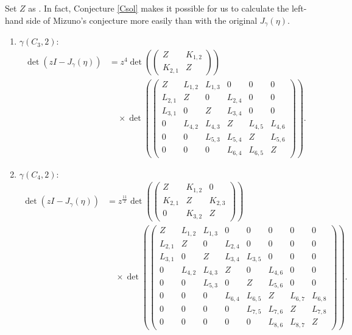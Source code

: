\documentclass[10pt,a4paper]{amsart}
\numberwithin{equation}{section}
\begin{document}
	\begin{Example}
Set $Z$ as .
In fact, Conjecture \ref{Csol} makes it possible for us to calculate the left-hand side of Mizuno's conjecture more easily than with the original $J_\gamma(\eta)$.
		\begin{enumerate}\itemsep=0pt
			\item $\gamma(C_3,2)$:
				\begin{align*}
				\det (zI-J_\gamma(\eta))&{}=z^4\det \left(\begin{pmatrix}
					Z&K_{1,2}\\
					K_{2,1}&Z
				\end{pmatrix}\right)\\
				&\quad{}\times\det \left(\begin{pmatrix}
					Z&L_{1,2}&L_{1,3}&0&0&0\\%
					L_{2,1}&Z&0&L_{2,4}&0&0\\%
					L_{3,1}&0&Z&L_{3,4}&0&0\\%
					0&L_{4,2}&L_{4,3}&Z&L_{4,5}&L_{4,6}\\%
					0&0&L_{5,3}&L_{5,4}&Z&L_{5,6}\\%
					0&0&0&L_{6,4}&L_{6,5}&Z%
				\end{pmatrix}\right).
				\end{align*}
			\item $\gamma(C_4,2)$:
				\begin{align*}
				\det (zI-J_\gamma(\eta))&{}=z^\frac{11}{2}\det \left(\begin{pmatrix}
					Z&K_{1,2}&0\\
					K_{2,1}&Z&K_{2,3}\\
					0&K_{3,2}&Z
				\end{pmatrix}\right)\\
				&\quad{}\times\det \left(\begin{pmatrix}
					Z&L_{1,2}&L_{1,3}&0&0&0&0&0\\%
					L_{2,1}&Z&0&L_{2,4}&0&0&0&0\\%
					L_{3,1}&0&Z&L_{3,4}&L_{3,5}&0&0&0\\%
					0&L_{4,2}&L_{4,3}&Z&0&L_{4,6}&0&0\\%
					0&0&L_{5,3}&0&Z&L_{5,6}&0&0\\%
					0&0&0&L_{6,4}&L_{6,5}&Z&L_{6,7}&L_{6,8}\\%
					0&0&0&0&L_{7,5}&L_{7,6}&Z&L_{7,8}\\%
					0&0&0&0&0&L_{8,6}&L_{8,7}&Z%
				\end{pmatrix}\right).
				\end{align*}
		\end{enumerate}
	\end{Example}
\end{document}
